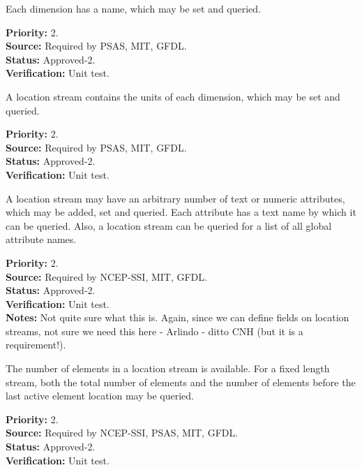 Each dimension has a name, which may be set and queried.
\begin{reqlist}
{\bf Priority:} 2. \\
{\bf Source:} Required by PSAS, MIT, GFDL.\\
{\bf Status:} Approved-2. \\
{\bf Verification:} Unit test.
\end{reqlist}

A location stream contains the units of each dimension, which may be set and queried.
\begin{reqlist}
{\bf Priority:} 2. \\
{\bf Source:} Required by PSAS, MIT, GFDL.\\
{\bf Status:} Approved-2. \\
{\bf Verification:} Unit test.
\end{reqlist}


A location stream may have an arbitrary number of text or numeric attributes,
which may be added, set and queried.  Each attribute has a text name by which it
can be queried.  Also, a location stream can be queried for a list of all global
attribute names.

\begin{reqlist}
{\bf Priority:} 2. \\
{\bf Source:} Required by NCEP-SSI, MIT, GFDL. \\
{\bf Status:} Approved-2. \\
{\bf Verification:} Unit test. \\
{\bf Notes:} Not quite sure what this is. Again, since we can define fields on location streams, not sure we need this here - Arlindo - ditto CNH (but it is a requirement!).
\end{reqlist}

The number of elements in a location stream is available.  For a fixed length stream,
both the total number of elements and the number of elements before the last
active element location may be queried.
\begin{reqlist}
{\bf Priority:} 2. \\
{\bf Source:} Required by NCEP-SSI, PSAS, MIT, GFDL.\\
{\bf Status:} Approved-2. \\
{\bf Verification:} Unit test. 
\end{reqlist}

